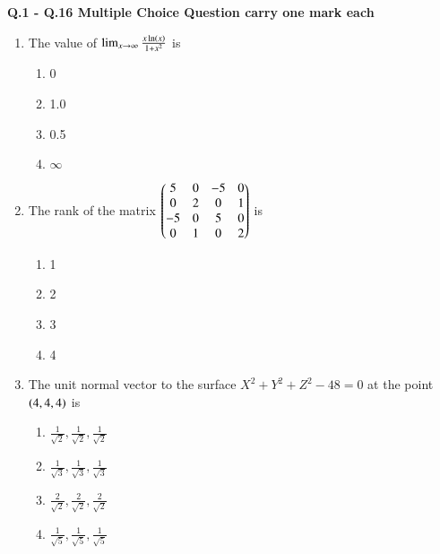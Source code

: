 \documentclass[journal,12pt,onecolumn]{article}
\theoremstyle{remark}
\begin{document}
\textbf{Q.1 - Q.16 Multiple Choice Question carry one mark each }

\begin{enumerate}
\item The value of $\lim_{x \to \infty} \frac{x \ln\left(x\right)}{1+x^2}$ is

\hfill{}

\begin{multicols}{2}
\begin{enumerate}
    \item 0
    \item 1.0
    \item 0.5
    \item $\infty$
\end{enumerate}
\end{multicols}

\item The rank of the matrix $\begin{pmatrix}5 & 0 & -5 & 0 \\ 0 & 2 & 0 & 1 \\ -5 & 0 & 5 & 0 \\ 0 & 1 & 0 & 2\end{pmatrix}$ is

\hfill{}

\begin{multicols}{2}
\begin{enumerate}
    \item 1
    \item 2
    \item 3
    \item 4
\end{enumerate}
\end{multicols}

\item The unit normal vector to the surface $X^2+Y^2+Z^2-48=0$ at the point $\left(4, 4, 4\right)$ is

\hfill{}

\begin{enumerate}
    \item $\frac{1}{\sqrt{2}}, \frac{1}{\sqrt{2}}, \frac{1}{\sqrt{2}}$
    \item $\frac{1}{\sqrt{3}}, \frac{1}{\sqrt{3}}, \frac{1}{\sqrt{3}}$
    \item $\frac{2}{\sqrt{2}}, \frac{2}{\sqrt{2}}, \frac{2}{\sqrt{2}}$
    \item $\frac{1}{\sqrt{5}}, \frac{1}{\sqrt{5}}, \frac{1}{\sqrt{5}}$
\end{enumerate}


\end{enumerate}
\end{document}
